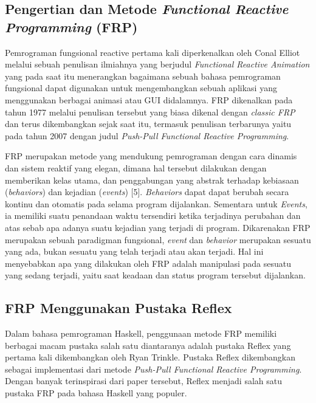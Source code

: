 \documentclass[pi.tex]{subfile}
\begin{document}
\subsection{Pengertian dan Metode \emph{Functional Reactive Programming} (FRP)}\hspace{6pt}
Pemrograman fungsional reactive pertama kali diperkenalkan oleh Conal Elliot melalui sebuah penulisan ilmiahnya yang berjudul \emph{Functional Reactive Animation} yang pada saat itu menerangkan bagaimana sebuah bahasa pemrograman fungsional dapat digunakan untuk mengembangkan sebuah aplikasi yang menggunakan berbagai animasi atau GUI didalamnya. FRP dikenalkan pada tahun 1977 melalui penulisan tersebut yang biasa dikenal dengan \emph{classic FRP} dan terus dikembangkan sejak saat itu, termasuk penulisan terbarunya yaitu pada tahun 2007 dengan judul \emph{Push-Pull Functional Reactive Programming}.

\hspace{6pt}FRP merupakan metode yang mendukung pemrograman dengan cara dinamis dan sistem reaktif yang elegan, dimana hal tersebut dilakukan dengan memberikan kelas utama, dan penggabungan yang abstrak terhadap kebiasaan (\emph{behaviors}) dan kejadian (\emph{events}) [5]. \emph{Behaviors} dapat dapat berubah secara kontinu dan otomatis pada selama program dijalankan. Sementara untuk \emph{Events}, ia memiliki suatu penandaan waktu tersendiri ketika terjadinya perubahan dan atas sebab apa adanya suatu kejadian yang terjadi di program. Dikarenakan FRP merupakan sebuah paradigman fungsional, \emph{event} dan \emph{behavior} merupakan sesuatu yang ada, bukan sesuatu yang telah terjadi atau akan terjadi. Hal ini menyebabkan apa yang dilakukan oleh FRP adalah manipulasi pada sesuatu yang sedang terjadi, yaitu saat keadaan dan status program tersebut dijalankan.

\subsection{FRP Menggunakan Pustaka Reflex}\hspace{5pt}
Dalam bahasa pemrograman Haskell, penggunaan metode FRP memiliki berbagai macam pustaka salah satu diantaranya adalah pustaka Reflex yang pertama kali dikembangkan oleh Ryan Trinkle. Pustaka Reflex dikembangkan sebagai implementasi dari metode \emph{Push-Pull Functional Reactive Programming}. Dengan banyak terinspirasi dari paper tersebut, Reflex menjadi salah satu pustaka FRP pada bahasa Haskell yang populer.
\end{document}
